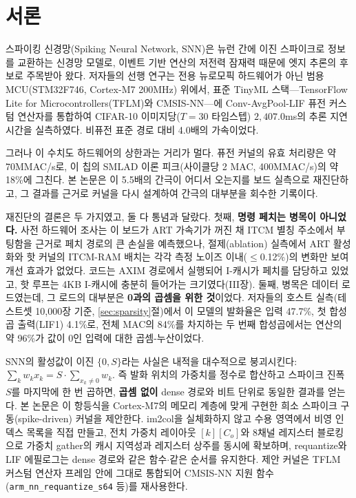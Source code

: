 \section{서론}\label{sec:intro}

스파이킹 신경망(Spiking Neural Network, SNN)은 뉴런 간에 이진
스파이크로 정보를 교환하는 신경망 모델로\cite{maass1997networks},
이벤트 기반 연산의 저전력 잠재력 때문에 엣지 추론의 후보로 주목받아
왔다\cite{roy2019towards}. 저자들의 선행 연구\cite{cha2026fusion}는
전용 뉴로모픽 하드웨어\cite{davies2018loihi,merolla2014truenorth}가
아닌 범용 MCU(STM32F746, Cortex-M7 200MHz) 위에서, 표준 TinyML
스택---TensorFlow Lite for Microcontrollers(TFLM)\cite{david2021tflm}와
CMSIS-NN\cite{lai2018cmsisnn}---에 Conv-AvgPool-LIF 퓨전 커스텀
연산자를 통합하여 CIFAR-10 이미지당($T{=}30$ 타임스텝) $2{,}407.0$ms의
추론 지연시간을 실측하였다. 비퓨전 표준 경로 대비 4.0배의 가속이었다.

그러나 이 수치도 하드웨어의 상한과는 거리가 멀다. 퓨전 커널의 유효
처리량은 약 70MMAC/s로, 이 칩의 SMLAD 이론 피크(사이클당 2 MAC,
400MMAC/s)의 약 18\%에 그친다. 본 논문은 이 5.5배의 간극이 어디서
오는지를 보드 실측으로 재진단하고, 그 결과를 근거로 커널을 다시
설계하여 간극의 대부분을 회수한 기록이다.

재진단의 결론은 두 가지였고, 둘 다 통념과 달랐다. 첫째, \textbf{명령
페치는 병목이 아니었다.} 사전 하드웨어 조사는 이 보드가 ART
가속기가 꺼진 채 ITCM 별칭 주소에서 부팅함을 근거로 페치 경로의 큰
손실을 예측했으나, 절제(ablation) 실측에서 ART 활성화와 핫 커널의
ITCM-RAM 배치는 각각 측정 노이즈 이내($\le$0.12\%)의 변화만 보여
개선 효과가 없었다. 코드는 AXIM 경로에서
실행되어 I-캐시가 페치를 담당하고 있었고, 핫 루프는 4KB I-캐시에
충분히 들어가는 크기였다(III장). 둘째, 병목은
데이터 로드였는데, 그 로드의 대부분은 \textbf{0과의 곱셈을 위한
것}이었다. 저자들의 호스트 실측(테스트셋 10{,}000장 기준,
\ref{sec:sparsity}절)에서 이 모델의 발화율은 입력 47.7\%, 첫 합성곱
출력(LIF1) 4.1\%로, 전체 MAC의 84\%를 차지하는 두 번째 합성곱에서는
연산의 약 96\%가 값이 0인 입력에 대한 곱셈-누산이었다.

SNN의 활성값이 이진 $\{0, S\}$라는 사실은 내적을 대수적으로
붕괴시킨다: $\sum_k w_k x_k = S\cdot\sum_{x_k\neq 0} w_k$. 즉 발화
위치의 가중치를 정수로 합산하고 스파이크 진폭 $S$를 마지막에 한 번
곱하면, \textbf{곱셈 없이} dense 경로와 비트 단위로 동일한 결과를
얻는다. 본 논문은 이 항등식을 Cortex-M7의 메모리 계층에 맞게
구현한 희소 스파이크 구동(spike-driven) 커널을 제안한다. im2col을
실체화하지 않고 수용 영역에서 비영 인덱스 목록을 직접 만들고, 전치
가중치 레이아웃 $[k][C_o]$와 8채널 레지스터 블로킹으로 가중치
gather의 캐시 지역성과 레지스터 상주를 동시에 확보하며, requantize와
LIF 에필로그는 dense 경로와 같은 함수$\cdot$같은 순서를 유지한다.
제안 커널은 TFLM 커스텀 연산자 프레임 안에 그대로 통합되어 CMSIS-NN
지원 함수(\texttt{arm\_nn\_requantize\_s64} 등)를 재사용한다.

